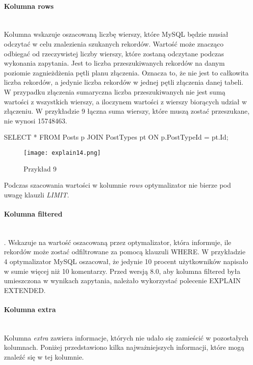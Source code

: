 \paragraph{Kolumna rows}\leavevmode\\
Kolumna wskazuje oszacowaną liczbę wierszy, które MySQL będzie musiał odczytać w celu znalezienia szukanych rekordów. Wartość może znacząco odbiegać od rzeczywistej liczby wierszy, które zostaną odczytane podczas wykonania zapytania. Jest to liczba przeszukiwanych rekordów na danym poziomie zagnieżdżenia pętli planu złączenia. Oznacza to, że nie jest to całkowita liczba rekordów, a jedynie liczba rekordów w jednej pętli złączenia danej tabeli. W przypadku złączenia sumaryczna liczba przeszukiwanych nie jest sumą wartości z wszystkich wierszy, a iloczynem wartości z wierszy biorących udział w złączeniu. W przykładzie 9 łączna suma wierszy, które muszą zostać przeszukane, nie wynosi 15748463.
\begin{spverbatim}
	SELECT * FROM Posts p JOIN PostTypes pt ON p.PostTypeId = pt.Id;
\end{spverbatim}
\begin{figure}[H]
	\texttt{[image: explain14.png]} 
	\caption{Przykład 9}
\end{figure}
Podczas szacowania wartości w kolumnie \textit{rows} optymalizator nie bierze pod uwagę klauzli \textit{LIMIT}.

\paragraph{Kolumna filtered}\leavevmode\\. Wskazuje na wartość oszacowaną przez optymalizator, która informuje, ile rekordów może zostać odfiltrowane za pomocą klauzuli WHERE. W przykładzie 4 optymalizator MySQL oszacował, że jedynie 10 procent użytkowników napisało w sumie więcej niż 10 komentarzy. Przed wersją 8.0, aby kolumna filtered była umieszczona w wynikach zapytania, należało wykorzystać polecenie EXPLAIN EXTENDED.

\paragraph{Kolumna extra}\leavevmode\\
Kolumna \textit{extra} zawiera informacje, których nie udało się zamieścić w pozostałych kolumnach. Poniżej przedstawiono kilka najważniejszych informacji, które mogą znaleźć się w tej kolumnie.

